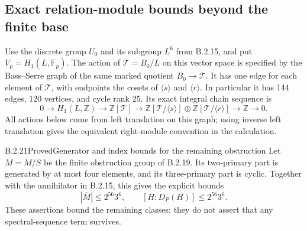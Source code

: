 \subsection{Exact relation-module bounds beyond the finite base}

Use the discrete group $U_0$ and its subgroup $L^6$
from B.2.15, and put $V_p=H_1(L,\mathbb F_p)$.
The action of $\mathcal T=B_0/L$ on this vector space
is specified by the Bass--Serre graph of the same
marked quotient $B_0\to\mathcal T$.  It has one edge
for each element of $\mathcal T$, with endpoints the
cosets of $\langle s\rangle$ and
$\langle r\rangle$.  In particular it has 144 edges,
120 vertices, and cycle rank 25.  Its exact integral
chain sequence is
\[
0\longrightarrow H_1(L,\mathbb Z)
 \longrightarrow\mathbb Z[\mathcal T]
 \longrightarrow
 \mathbb Z[\mathcal T/\langle s\rangle]
 \oplus\mathbb Z[\mathcal T/\langle r\rangle]
 \longrightarrow\mathbb Z\longrightarrow0.                    \tag{B.S38}
\]
All actions below come from left translation on this
graph; using inverse left translation gives the
equivalent right-module convention in the calculation.

\begin{result}{B.2.21}{Proved}{Generator and index bounds for the remaining obstruction}
Let $\overline M=M/S$ be the finite obstruction group
of B.2.19.  Its two-primary part is generated by at
most four elements, and its three-primary part is
cyclic.  Together with the annihilator in B.2.15,
this gives the explicit bounds
\[
 |\overline M|\leq 2^{56}3^6,
       \qquad [H:D_P(H)]\leq 2^{56}3^6.                       \tag{B.S39}
\]
These assertions bound the remaining classes; they
do not assert that any spectral-sequence term survives.
\end{result}

